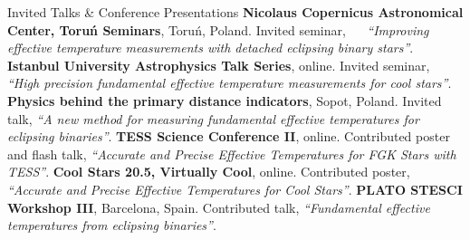 \begin{rubric}{Invited Talks \& Conference Presentations}
\entry*[2023]%
        \textbf{Nicolaus Copernicus Astronomical Center, Toru\'{n} Seminars}, Toru\'{n}, Poland. Invited seminar, ~~ \textit{``Improving effective temperature measurements with detached eclipsing binary stars''}.
\entry*[2022]%
        \textbf{Istanbul University Astrophysics Talk Series}, online. Invited seminar, \textit{``High precision fundamental effective temperature measurements for cool stars''}.
\entry*[2021]%
	\textbf{Physics behind the primary distance indicators}, Sopot, Poland. Invited talk, \textit{``A new method for measuring fundamental effective temperatures for eclipsing binaries''}.
\entry*[2021]%
	\textbf{TESS Science Conference II}, online. Contributed poster and flash talk, \textit{``Accurate and Precise Effective Temperatures for FGK Stars with TESS''}. 
\entry*[2021]%
	\textbf{Cool Stars 20.5, Virtually Cool}, online. Contributed poster, \textit{``Accurate and Precise Effective Temperatures for Cool Stars''}. 
\entry*[2019]%
	\textbf{PLATO STESCI Workshop III}, Barcelona, Spain. Contributed talk, \textit{``Fundamental effective temperatures from eclipsing binaries''}.  
%
%
%
%
\end{rubric}